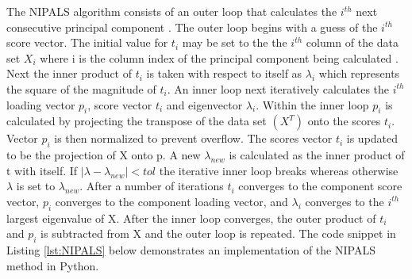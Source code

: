 \documentclass[12pt]{article}
\begin{document}
The NIPALS algorithm consists of an outer loop that calculates the $i^{th}$ next consecutive principal component . The outer loop begins with a guess of the $i^{th}$ score  vector. The initial value for $t_i$ may be set to the the $i^{th}$ column of the data set $X_i$ where i is the column index of the principal component being calculated \cite{risvik2007principal}. Next the inner product of $t_i$ is taken with respect to itself as $\lambda_i$ which represents the square of the magnitude of $t_i$. An inner loop next iteratively calculates the $i^{th}$ loading vector $p_i$, score vector $t_i$ and eigenvector $\lambda_i$. Within the inner loop $p_i$ is calculated by projecting the transpose of the data set $(X^T)$ onto the scores $t_i$. Vector $p_i$ is then normalized to prevent overflow. The scores vector $t_i$ is updated to be the projection of X onto p. A new $\lambda_{new}$ is calculated as the inner product of t with itself. If $|\lambda-\lambda_{new}|<tol$ the iterative inner loop breaks whereas otherwise $\lambda$ is set to $\lambda_{new}$.  After a number of iterations $t_i$ converges to the component score vector, $p_i$ converges to the component loading vector, and $\lambda_i$ converges to the $i^{th}$ largest eigenvalue of X. After the inner loop converges, the outer product of $t_i$ and $p_i$ is subtracted from X and the outer loop is repeated. The code snippet in Listing \ref{lst:NIPALS} below demonstrates an implementation of the NIPALS method in Python.
\end{document}
